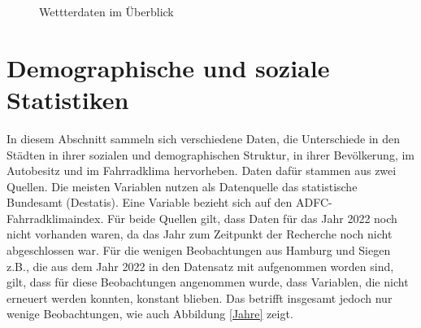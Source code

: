 \documentclass[a4paper,12pt]{thesis}
\begin{document}
\begin{figure}%
	\centering
	\qquad
	\caption{Wettterdaten im Überblick}%
	\label{fig:TempNied}%
\end{figure}


\section{Demographische und soziale Statistiken}\label{Daten_Stadt}

In diesem Abschnitt sammeln sich verschiedene Daten, die Unterschiede in den Städten in ihrer sozialen und demographischen Struktur, in ihrer Bevölkerung, im Autobesitz und im Fahrradklima hervorheben. Daten dafür stammen aus zwei Quellen. Die meisten Variablen nutzen als Datenquelle das statistische Bundesamt (Destatis). Eine Variable bezieht sich auf den ADFC-Fahrradklimaindex. Für beide Quellen gilt, dass Daten für das Jahr 2022 noch nicht vorhanden waren, da das Jahr zum Zeitpunkt der Recherche noch nicht abgeschlossen war. Für die wenigen Beobachtungen aus Hamburg und Siegen z.B., die aus dem Jahr 2022 in den Datensatz mit aufgenommen worden sind, gilt, dass für diese Beobachtungen angenommen wurde, dass Variablen, die nicht erneuert werden konnten, konstant blieben. Das betrifft insgesamt jedoch nur wenige Beobachtungen, wie auch Abbildung \ref{Jahre} zeigt.
\end{document}
